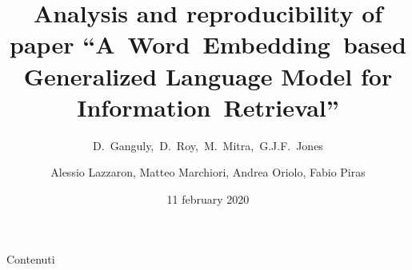 \documentclass{beamer}
\title{Analysis and reproducibility of paper ``A~Word~Embedding~based Generalized Language Model for Information~Retrieval''}
\subtitle{D.~Ganguly,~D.~Roy,~M.~Mitra,~G.J.F.~Jones}
\author{Alessio Lazzaron, Matteo Marchiori, Andrea Oriolo, Fabio Piras}
\date{11 february 2020}
\begin{document}
\maketitle
\begin{frame}{Contenuti}
    \tableofcontents
\end{frame}




\end{document}
